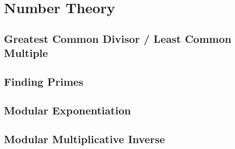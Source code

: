 \section{Number Theory} %

\subsection{Greatest Common Divisor / Least Common Multiple} %


\subsection{Finding Primes} %


\subsection{Modular Exponentiation} %


\subsection{Modular Multiplicative Inverse} %


